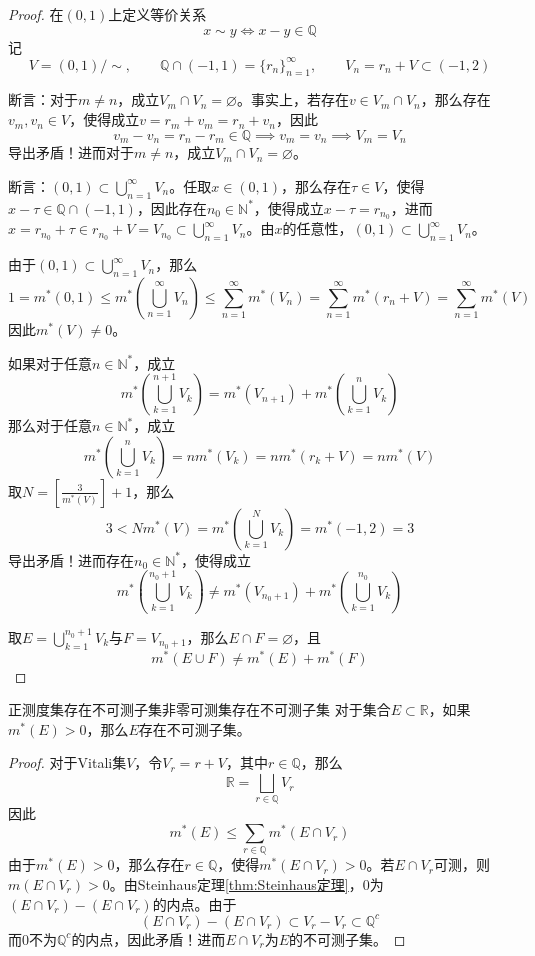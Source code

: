 \documentclass[lang = cn, scheme = chinese, thmcnt = section]{elegantbook}
\newcommand{\N}{\mathbb{N}}            %
\newcommand{\R}{\mathbb{R}}            %
\newcommand{\Q}{\mathbb{Q}}            %
\newcommand{\sub}{\subset}             %
\newcommand{\dis}{\displaystyle}
\begin{document}
\begin{proof}
	在$(0,1)$上定义等价关系%
	$$
	x\sim y\iff x-y\in\Q
	$$
	记
	$$
	V=(0,1)/\sim,\qquad 
	\Q\cap(-1,1)=\{ r_n \}_{n=1}^{\infty},\qquad 
	V_n=r_n+V\sub(-1,2)
	$$
	
	断言：对于$m\ne n$，成立$V_m\cap V_n=\varnothing$。事实上，若存在$v\in V_m\cap V_n$，那么存在$v_m,v_n\in V$，使得成立$v=r_m+v_m=r_n+v_n$，因此%
	$$
	v_m-v_n=r_n-r_m\in\Q\implies v_m=v_n\implies V_m=V_n
	$$
	导出矛盾！进而对于$m\ne n$，成立$V_m\cap V_n=\varnothing$。
	
	断言：$\dis (0,1)\sub\bigcup_{n=1}^{\infty}V_n$。任取$x\in (0,1)$，那么存在$\tau\in V$，使得$x-\tau\in\Q\cap(-1,1)$，因此存在$n_0\in\N^*$，使得成立$x-\tau=r_{n_0}$，进而$x=r_{n_0}+\tau\in r_{n_0}+V=V_{n_0}\sub \bigcup_{n=1}^{\infty}V_n$。由$x$的任意性，$\dis (0,1)\sub\bigcup_{n=1}^{\infty}V_n$。
	
	由于$\dis (0,1)\sub\bigcup_{n=1}^{\infty}V_n$，那么
	$$
	1=m^*(0,1)\le 
	m^*\left(\bigcup_{n=1}^{\infty}V_n\right)
	\le\sum_{n=1}^{\infty}m^*(V_n)
	=\sum_{n=1}^{\infty}m^*(r_n+V)
	=\sum_{n=1}^{\infty}m^*(V)
	$$
	因此$m^*(V)\ne 0$。
	
	如果对于任意$n\in\N^*$，成立%
	$$
	m^*\left(\bigcup_{k=1}^{n+1}V_k\right)
	=m^*(V_{n+1})+m^*\left(\bigcup_{k=1}^{n}V_k\right)
	$$
	那么对于任意$n\in\N^*$，成立%
	$$
	m^*\left(\bigcup_{k=1}^{n}V_k\right)=nm^*(V_k)=nm^*(r_k+V)=nm^*(V)
	$$
	取$N=\left[\frac{3}{m^*(V)}\right]+1$，那么%
	$$
	3
	<Nm^*(V)
	=m^*\left(\bigcup_{k=1}^{N}V_k\right)
	=m^*(-1,2)
	=3
	$$
	导出矛盾！进而存在$n_0\in\N^*$，使得成立
	$$
	m^*\left(\bigcup_{k=1}^{n_0+1}V_k\right)
	\ne m^*(V_{n_0+1})+m^*\left(\bigcup_{k=1}^{n_0}V_k\right)
	$$
	
	取$\dis E=\bigcup_{k=1}^{n_0+1}V_k$与$F=V_{n_0+1}$，那么$E\cap F=\varnothing$，且
	$$
	m^*(E\cup F)\ne m^*(E)+m^*(F)
	$$
\end{proof}

\begin{theorem}{正测度集存在不可测子集}{非零可测集存在不可测子集}
	对于集合$E\sub\R$，如果$m^*(E)>0$，那么$E$存在不可测子集。
\end{theorem}

\begin{proof}
	对于Vitali集$V$，令$V_r=r+V$，其中$r\in \Q$，那么
	$$
	\R=\bigsqcup_{r\in\Q}V_r
	$$
	因此%
	$$
	m^*(E)\le\sum_{r\in\Q}m^*(E\cap V_r)
	$$
	由于$m^*(E)>0$，那么存在$r\in\Q$，使得$m^*(E\cap V_r)>0$。若$E\cap V_r$可测，则$m(E\cap V_r)>0$。由Steinhaus定理\ref{thm:Steinhaus定理}，$0$为$(E\cap V_r)-(E\cap V_r)$的内点。由于
	$$
	(E\cap V_r)-(E\cap V_r)\sub V_r-V_r\sub\Q^c
	$$
	而$0$不为$\Q^c$的内点，因此矛盾！进而$E\cap V_r$为$E$的不可测子集。
\end{proof}
\end{document}
